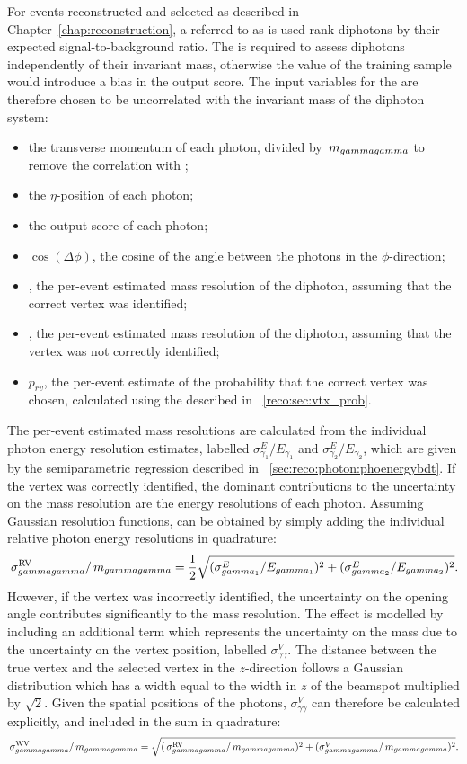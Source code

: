 For events reconstructed and selected as described in Chapter~\ref{chap:reconstruction}, a \BDT referred to as \DiPhoBdt is used rank diphotons by their expected signal-to-background ratio. The \DiPhoBdt is required to assess diphotons independently of their invariant mass, otherwise the \mH value of the training sample would introduce a bias in the output score. The input variables for the \DiPhoBdt are therefore chosen to be uncorrelated with the invariant mass of the diphoton system:

\begin{itemize}
\item the transverse momentum of each photon, divided by $\,m_{gammagamma}$ to remove the correlation with \mH;
\item the $\eta$-position of each photon;
\item the \PhoIdBdt output score of each photon;
\item $\cos(\Delta\phi)$, the cosine of the angle between the photons in the $\phi$-direction;
\item \sigmarv, the per-event estimated mass resolution of the diphoton, assuming that the correct vertex was identified;
\item \sigmawv, the per-event estimated mass resolution of the diphoton, assuming that the vertex was not correctly identified;
\item $p_{rv}$, the per-event estimate of the probability that the correct vertex was chosen, calculated using the \VtxProbBdt described in \Sec~\ref{reco:sec:vtx_prob}.
\end{itemize}

The per-event estimated mass resolutions are calculated from the individual photon energy resolution estimates, labelled $\sigma^E_{\gamma_1}/E_{\gamma_1}$ and $\sigma^E_{\gamma_2}/E_{\gamma_2}$, which are given by the semiparametric regression \PhoEnergyBdt described in \Sec~\ref{sec:reco:photon:phoenergybdt}. If the vertex was correctly identified, the dominant contributions to the uncertainty on the mass resolution are the energy resolutions of each photon. Assuming Gaussian resolution functions, \sigmarv can be obtained by simply adding the individual relative photon energy resolutions in quadrature:
\begin{equation}
\,\sigma^\text{RV}_{gammagamma}/\,m_{gammagamma}= \frac{1}{2} \sqrt{({\sigma^E_{gamma_1}}/{E_{gamma_1}})^2 +({\sigma^E_{gamma_2}}/{E_{gamma_2}})^2 }.
\end{equation} 
However, if the vertex was incorrectly identified, the uncertainty on the opening angle contributes significantly to the mass resolution. The effect is modelled by including an additional term which represents the uncertainty on the mass due to the uncertainty on the vertex position, labelled $\sigma^V_{\gamma\gamma}$. The distance between the true vertex and the selected vertex in the $z$-direction follows a Gaussian distribution which has a width equal to the width in $z$ of the beamspot multiplied by $\sqrt{2}$. Given the spatial positions of the photons, $\sigma^V_{\gamma\gamma}$ can therefore be calculated explicitly, and included in the sum in quadrature:
\begin{equation}
\,\sigma^\text{WV}_{gammagamma}/\,m_{gammagamma}= \sqrt{(\,\sigma^\text{RV}_{gammagamma}/\,m_{gammagamma})^2 +(\sigma^V_{gammagamma}/\,m_{gammagamma})^2 }.
\end{equation} 

